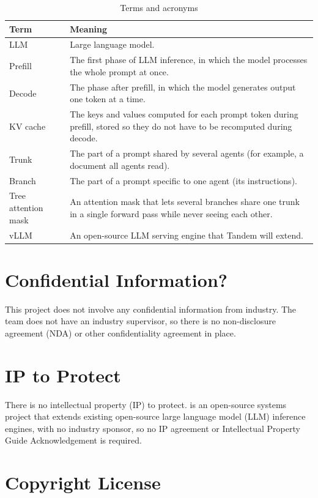 \documentclass{article}
\begin{document}
\begin{table}[H]
\caption{Terms and acronyms} \label{TblTerms}
\begin{tabularx}{\textwidth}{lX}
\toprule
\textbf{Term} & \textbf{Meaning}\\
\midrule
LLM & Large language model.\\
Prefill & The first phase of LLM inference, in which the model processes
the whole prompt at once.\\
Decode & The phase after prefill, in which the model generates output one
token at a time.\\
KV cache & The keys and values computed for each prompt token during
prefill, stored so they do not have to be recomputed during decode.\\
Trunk & The part of a prompt shared by several agents (for example, a
document all agents read).\\
Branch & The part of a prompt specific to one agent (its instructions).\\
Tree attention mask & An attention mask that lets several branches share
one trunk in a single forward pass while never seeing each other.\\
vLLM & An open-source LLM serving engine that Tandem will extend.\\
\bottomrule
\end{tabularx}
\end{table}

\section{Confidential Information?}

This project does not involve any confidential information from industry.
The team does not have an industry supervisor, so there is no
non-disclosure agreement (NDA) or other confidentiality agreement in place.

\section{IP to Protect}

There is no intellectual property (IP) to protect. \progname{} is an
open-source systems project that extends existing open-source large
language model (LLM) inference engines, with no industry sponsor, so no IP
agreement or
Intellectual Property Guide Acknowledgement is required.

\section{Copyright License}
\end{document}
